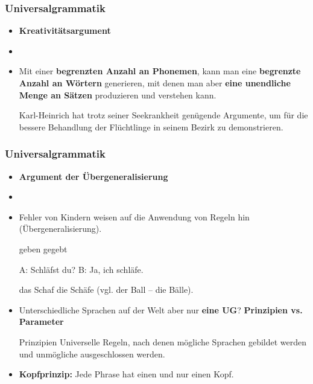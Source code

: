\begin{frame}
\frametitle{Universalgrammatik}

\begin{itemize}
	\item \textbf{Kreativitätsargument}
	\item[]
	\item Mit einer \textbf{begrenzten Anzahl an Phonemen}, kann man eine \textbf{begrenzte Anzahl an Wörtern} generieren, mit denen man aber \textbf{eine unendliche Menge an Sätzen} produzieren und verstehen kann.

\pause	
	\ea Karl-Heinrich hat trotz seiner Seekrankheit genügende Argumente, um für die bessere Behandlung der Flüchtlinge in seinem Bezirk zu demonstrieren.
	\z

\end{itemize}

\end{frame}


\begin{frame}
\frametitle{Universalgrammatik}

\begin{itemize}
	\item \textbf{Argument der Übergeneralisierung}
	\item[]
	\item Fehler von Kindern weisen auf die Anwendung von Regeln hin (Übergeneralisierung).

\pause	
	\eal 
	\ex geben
	\ex gegebt
	\zl
	
	\eal 
	\ex A: Schläfst du?
	\ex B: Ja, ich schläfe.
	\zl
	
	\eal 
	\ex das Schaf
	\ex die Schäfe (vgl. der Ball -- die Bälle).
	\zl

\end{itemize}

\end{frame}


\begin{frame}

\begin{itemize}
	\item Unterschiedliche Sprachen auf der Welt aber nur \textbf{eine UG}? \ras \textbf{Prinzipien vs. Parameter}

	\begin{block}{Prinzipien}
	Universelle Regeln, nach denen mögliche Sprachen gebildet werden und unmögliche ausgeschlossen werden. 
	\end{block}
	
	\item \textbf{Kopfprinzip:} Jede Phrase hat einen und nur einen Kopf.

\pause
	\eal 
	\zl
	
\end{itemize}

\end{frame}


